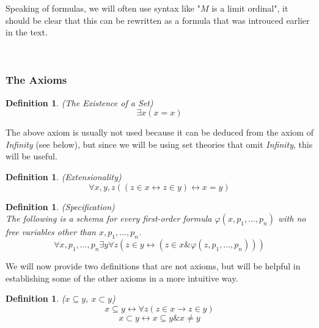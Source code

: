 \documentclass[12pt,a4paper]{article}
\newtheorem{definition}[theorem]{Definition}
\renewcommand{\iff}{\leftrightarrow}
\newcommand{\then}{\rightarrow}
\newcommand{\et}{\mathrel{\&}}
\begin{document}
Speaking of formulas, we will often use syntax like "$M$ is a limit ordinal", it should be clear that this can be rewritten as a formula that was introuced earlier in the text.

\


\subsubsection{The Axioms}

\begin{definition}{(The Existence of a Set)}\label{def:existence_of_a_set}
\begin{equation}
\exists x (x = x)
\end{equation}
\end{definition}
The above axiom is usually not used because it can be deduced from the axiom of \emph{Infinity} (see below), but since we will be using set theories that omit \emph{Infinity}, this will be useful.

\begin{definition}{(Extensionality)}\label{def:extensionality}
\begin{equation}
\forall x, y, z ((z \in x \iff z \in y) \iff x = y)
\end{equation}
\end{definition}

\begin{definition}{(Specification)}\label{def:specification}\\
The following is a schema for every first-order formula $\varphi(x, p_1, \ldots, p_n)$ with no free variables other than $x, p_1, \ldots, p_n$.
\begin{equation}
\forall x, p_1, \ldots, p_n \exists y \forall z ( z \in y \iff ( z \in x \et \varphi(z, p_1, \ldots, p_n)))
\end{equation}
\end{definition}

We will now provide two definitions that are not axioms, but will be helpful in establishing some of the other axioms in a more intuitive way.
\begin{definition}{($x \subseteq y$, $x \subset y$)}
\begin{equation}
x \subseteq y \iff \forall z(z \in x \then z \in y)
\end{equation}
\begin{equation}
x \subset y \iff x \subseteq y \et x \neq y
\end{equation}
\end{definition}
\end{document}
